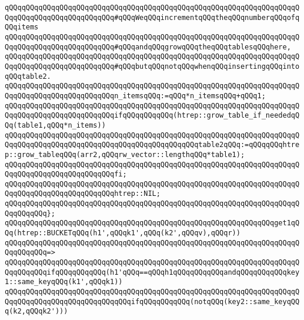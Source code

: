 \newline
\verb|qQQqqQQqqQQqqQQqqQQqqQQqqQQqqQQqqQQqqQQqqQQqqQQqqQQqqQQqqQQqqQQqqQQqqQQqqQQqqQQqqQQqqQQqqQQqqQQq#qQQqWeqQQqincrementqQQqtheqQQqnumberqQQqofqQQqitems|\newline
\verb|qQQqqQQqqQQqqQQqqQQqqQQqqQQqqQQqqQQqqQQqqQQqqQQqqQQqqQQqqQQqqQQqqQQqqQQqqQQqqQQqqQQqqQQqqQQqqQQq#qQQqandqQQqgrowqQQqtheqQQqtablesqQQqhere,|\newline
\verb|qQQqqQQqqQQqqQQqqQQqqQQqqQQqqQQqqQQqqQQqqQQqqQQqqQQqqQQqqQQqqQQqqQQqqQQqqQQqqQQqqQQqqQQqqQQqqQQq#qQQqbutqQQqnotqQQqwhenqQQqinsertingqQQqintoqQQqtable2.|\newline
\newline
\verb|qQQqqQQqqQQqqQQqqQQqqQQqqQQqqQQqqQQqqQQqqQQqqQQqqQQqqQQqqQQqqQQqqQQqqQQqqQQqqQQqqQQqqQQqqQQqqQQqn_itemsqQQq:=qQQq*n_itemsqQQq+qQQq1;|\newline
\newline
\verb|qQQqqQQqqQQqqQQqqQQqqQQqqQQqqQQqqQQqqQQqqQQqqQQqqQQqqQQqqQQqqQQqqQQqqQQqqQQqqQQqqQQqqQQqqQQqqQQqifqQQqqQQqqQQq(htrep::grow_table_if_neededqQQq(table1,qQQq*n_items))|\newline
\verb|qQQqqQQqqQQqqQQqqQQqqQQqqQQqqQQqqQQqqQQqqQQqqQQqqQQqqQQqqQQqqQQqqQQqqQQqqQQqqQQqqQQqqQQqqQQqqQQqqQQqqQQqqQQqqQQqqQQqtable2qQQq:=qQQqqQQqhtrep::grow_tableqQQq(arr2,qQQqrw_vector::lengthqQQq*table1);|\newline
\verb|qQQqqQQqqQQqqQQqqQQqqQQqqQQqqQQqqQQqqQQqqQQqqQQqqQQqqQQqqQQqqQQqqQQqqQQqqQQqqQQqqQQqqQQqqQQqqQQqfi;|\newline
\newline
\verb|qQQqqQQqqQQqqQQqqQQqqQQqqQQqqQQqqQQqqQQqqQQqqQQqqQQqqQQqqQQqqQQqqQQqqQQqqQQqqQQqqQQqqQQqqQQqqQQqhtrep::NIL;|\newline
\verb|qQQqqQQqqQQqqQQqqQQqqQQqqQQqqQQqqQQqqQQqqQQqqQQqqQQqqQQqqQQqqQQqqQQqqQQqqQQqqQQq};|\newline
\newline
\verb|qQQqqQQqqQQqqQQqqQQqqQQqqQQqqQQqqQQqqQQqqQQqqQQqqQQqqQQqqQQqqQQqget1qQQq(htrep::BUCKETqQQq(h1',qQQqk1',qQQq(k2',qQQqv),qQQqr))|\newline
\verb|qQQqqQQqqQQqqQQqqQQqqQQqqQQqqQQqqQQqqQQqqQQqqQQqqQQqqQQqqQQqqQQqqQQqqQQqqQQqqQQq=>|\newline
\verb|qQQqqQQqqQQqqQQqqQQqqQQqqQQqqQQqqQQqqQQqqQQqqQQqqQQqqQQqqQQqqQQqqQQqqQQqqQQqqQQqifqQQqqQQqqQQq(h1'qQQq==qQQqh1qQQqqQQqqQQqandqQQqqQQqqQQqkey1::same_keyqQQq(k1',qQQqk1))|\newline
\newline
\verb|qQQqqQQqqQQqqQQqqQQqqQQqqQQqqQQqqQQqqQQqqQQqqQQqqQQqqQQqqQQqqQQqqQQqqQQqqQQqqQQqqQQqqQQqqQQqqQQqqQQqifqQQqqQQqqQQq(notqQQq(key2::same_keyqQQq(k2,qQQqk2')))|\newline
